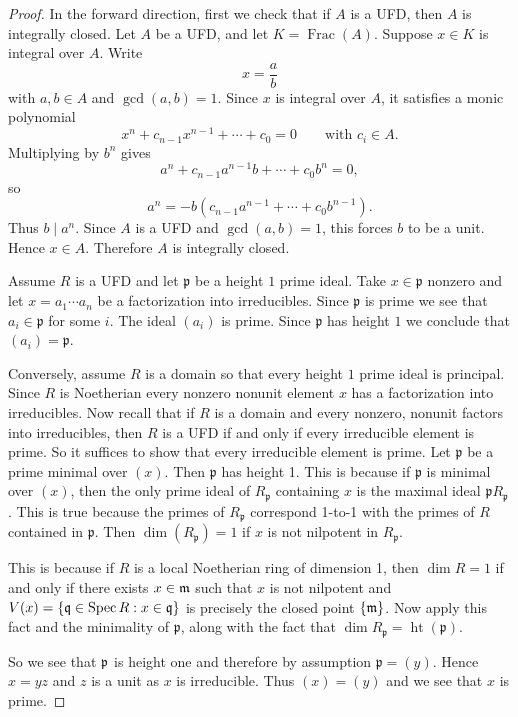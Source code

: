 \documentclass[12pt]{article}
\begin{document}
\begin{proof}
    In the forward direction, first we check that if $A$ is a UFD, then $A$ is integrally closed. Let $A$ be a UFD, and let $K=\operatorname{Frac}(A)$. Suppose $x\in K$ is integral over $A$. Write
    \[
        x=\frac{a}{b}
    \]
    with $a,b\in A$ and $\gcd(a,b)=1$. Since $x$ is integral over $A$, it satisfies a monic polynomial
    \[
        x^n+c_{n-1}x^{n-1}+\cdots+c_0=0
        \qquad\text{with } c_i\in A.
    \]
    Multiplying by $b^n$ gives
    \[
        a^n+c_{n-1}a^{n-1}b+\cdots+c_0b^n=0,
    \]
    so
    \[
        a^n=-b(c_{n-1}a^{n-1}+\cdots+c_0b^{n-1}).
    \]
    Thus $b\mid a^n$. Since $A$ is a UFD and $\gcd(a,b)=1$, this forces $b$ to be a unit. Hence $x\in A$. Therefore $A$ is integrally closed.




    Assume $R$ is a UFD and let $\mathfrak p$ be a height $1$ prime ideal. Take $x\in\mathfrak p$ nonzero and let $x=a_1\cdots a_n$ be a factorization into irreducibles. Since $\mathfrak p$ is prime we see that $a_i\in\mathfrak p$ for some $i$. The ideal $(a_i)$ is prime. Since $\mathfrak p$ has height $1$ we conclude that $(a_i)=\mathfrak p$.


    Conversely, assume $R$ is a domain so that every height $1$ prime ideal is principal. Since $R$ is Noetherian every nonzero nonunit element $x$ has a factorization into irreducibles. Now recall that
    if $R$ is a domain and every nonzero, nonunit factors into irreducibles, then $R$ is a UFD if and only if every irreducible element is prime. So it suffices to show that every irreducible element is prime. Let $\mathfrak p$ be a prime minimal over $(x)$. Then $\mathfrak p$ has height 1. This is because if $\mathfrak p$ is minimal over $(x)$, then the only prime ideal of $R_{\mathfrak p}$ containing $x$ is the maximal ideal $\mathfrak p R_{\mathfrak p}$. This is true because the primes of $R_{\mathfrak p}$ correspond 1-to-1 with the primes of $R$ contained in $\mathfrak p$. Then $\dim(R_{\mathfrak p})=1$ if $x$ is not nilpotent in $R_{\mathfrak p}$.


    This is because if $R$ is a local Noetherian ring of dimension 1, then $\dim R = 1$ if and only if there exists $x\in \mathfrak{m}$ such that $x$ is not nilpotent and $V(x)= \{\mathfrak{q}\in \operatorname{Spec} R: x\in \mathfrak{q}\}$ is precisely the closed point $\{\mathfrak{m}\}$. Now apply this fact and the minimality of $\mathfrak p$, along with the fact that $\dim R_{\mathfrak p} = \operatorname{ht}(\mathfrak p)$.

    So we see that $\mathfrak{p}$ is height one and therefore by assumption $\mathfrak p=(y)$. Hence $x=yz$ and $z$ is a unit as $x$ is irreducible. Thus $(x)=(y)$ and we see that $x$ is prime.


\end{proof}
\end{document}

